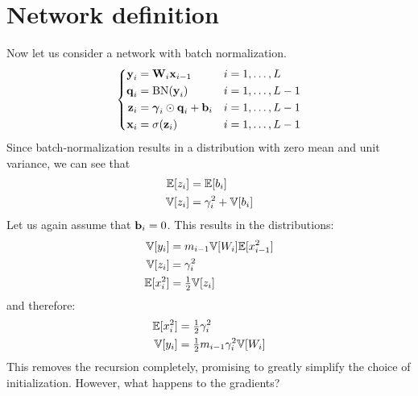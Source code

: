 \section{Network definition}

Now let us consider a network with batch normalization.
\begin{equation}
\left\{ \begin{aligned}
\boldsymbol{\mathbf{y}}_{i} & = \boldsymbol{\mathbf{W}}_{i} \boldsymbol{\mathbf{x}}_{i - 1} && i = 1, \dots, L \\
\boldsymbol{\mathbf{q}}_{i} & = \operatorname{BN}(\boldsymbol{\mathbf{y}}_{i}) && i = 1, \dots, L - 1 \\
\boldsymbol{\mathbf{z}}_{i} & = \boldsymbol{\mathbf{\gamma}}_{i} \odot \boldsymbol{\mathbf{q}}_{i} + \boldsymbol{\mathbf{b}}_{i} && i = 1, \dots, L - 1 \\
\boldsymbol{\mathbf{x}}_{i} & = \sigma(\boldsymbol{\mathbf{z}}_{i}) && i = 1, \dots, L - 1
\end{aligned} \right.
\end{equation}
Since batch-normalization results in a distribution with zero mean and unit variance, we can see that
\begin{align}
\mathbb{E}[z_{i}] & = \mathbb{E}[b_{i}] \\
\mathbb{V}[z_{i}] & = \gamma_{i}^2 + \mathbb{V}[b_{i}]
\end{align}
Let us again assume that $\boldsymbol{\mathbf{b}}_{i} = 0$.
This results in the distributions:
\begin{align}
\V[y_{i}] & = m_{i - 1} \V[W_{i}] \E[x_{i - 1}^2] \\ %
\V[z_{i}] & = \gamma_{i}^2 \\ %
\E[x_{i}^2] & = \tfrac{1}{2} \V[z_{i}] %
\end{align}
and therefore:
\begin{align}
\E[x_{i}^2] & = \tfrac{1}{2} \gamma_{i}^2 \\ %
\V[y_{i}] & = \tfrac{1}{2} m_{i - 1} \gamma_{i}^2 \V[W_{i}] %
\end{align}
This removes the recursion completely, promising to greatly simplify the choice of initialization.
However, what happens to the gradients?

